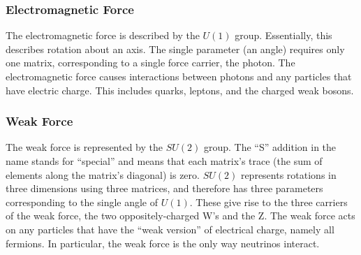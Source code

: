 \subsubsection{Electromagnetic Force}
\label{theory:EM}
The electromagnetic force is described by the $U(1)$ group.  
Essentially, this describes rotation about an axis.  %
The single parameter (an angle) requires only one matrix, 
corresponding to a single %
force carrier, the photon.  
The electromagnetic force causes interactions between 
photons and any particles that have electric charge.  
This includes quarks, leptons, and the charged weak bosons.  

\subsubsection{Weak Force}
\label{theory:weak}
The weak force is represented by the $SU(2)$ group.  
The ``S'' addition in the name stands for ``special'' 
and means that each matrix's trace 
(the sum of elements along the matrix's diagonal) is zero.  
$SU(2)$ represents rotations in three dimensions 
using three matrices, 
and therefore has three parameters corresponding 
to the single angle of $U(1)$.  
These give rise to the three carriers of the weak force, 
the two oppositely-charged W's and the Z.  %
The weak force acts on any particles that have the ``weak 
version'' of electrical charge, %
namely all fermions.  
In particular, the weak force is the only way 
neutrinos interact.  


